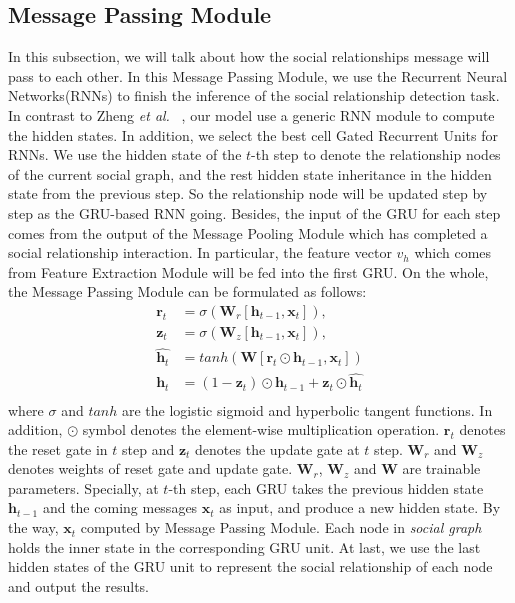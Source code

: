 \documentclass{article}
\newcommand{\etal}{{\it et al.}}
\begin{document}
\subsection{Message Passing Module} \label{section:RRNN}
In this subsection, we will talk about how the social relationships message will pass to each other.
In this Message Passing Module, we use the Recurrent Neural Networks(RNNs) to finish the inference of the social relationship detection task. In contrast to Zheng {\etal} \ \cite{DBLP:conf/iccv/0001JRVSDHT15}, our model use a generic RNN module to compute the hidden states. In addition, we select the best cell Gated Recurrent Units \cite{DBLP:conf/ssst/ChoMBB14} for RNNs. We use the hidden state of the $t$-th step to denote the relationship nodes of the current social graph, and the rest hidden state inheritance in the hidden state from the previous step. So the relationship node will be updated step by step as the GRU-based RNN going. Besides, the input of the GRU for each step comes from the output of the Message Pooling Module which has completed a social relationship interaction. In particular, the feature vector $v_h$ which comes from Feature Extraction Module will be fed into the first GRU. On the whole, the Message Passing Module can be formulated as follows:
\begin{equation}
\begin{split}
\bm{r}_t &=  \sigma(\bm{W}_{r}[\bm{h}_{t-1}, \bm{x}_t]), \\
\bm{z}_t &=  \sigma(\bm{W}_{z}[\bm{h}_{t-1}, \bm{x}_t]), \\
\hat{\bm{h}_t} &= tanh(\bm{W}[\bm{r}_t \odot \bm{h}_{t-1}, \bm{x}_{t}])\\
\bm{h}_t &= (1 - \bm{z}_t) \odot \bm{h}_{t - 1} + \bm{z}_t \odot \hat{\bm{h}_t} \\
\end{split}
\end{equation}
where $\sigma$ and $tanh$ are the logistic sigmoid and hyperbolic tangent functions. In addition, $\odot$ symbol denotes the element-wise multiplication operation. $\bm{r}_t$ denotes the reset gate in $t$ step and $\bm{z}_t$ denotes the update gate at $t$ step. $\bm{W}_r$ and $\bm{W}_z$ denotes weights of reset gate and update gate. $\bm{W}_r$, $\bm{W}_z$ and $\bm{W}$ are trainable parameters. Specially, at $t$-th step, each GRU takes the previous hidden state $\bm{h}_{t-1}$ and the coming messages $\bm{x}_{t}$ as input, and produce a new hidden state. By the way, $\bm{x}_t$ computed by Message Passing Module. Each node in \emph{social graph} holds the inner state in the corresponding GRU unit. At last, we use the last hidden states of the GRU unit to represent the social relationship of each node and output the results.
\end{document}
